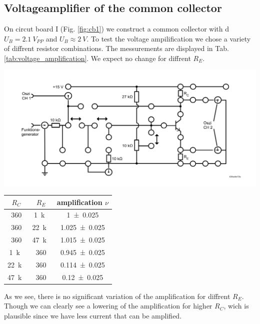 \documentclass[a4paper,10pt]{article}
\newenvironment{Figure}
  {\par\medskip\noindent\minipage{\linewidth}}
  {\endminipage\par\medskip} %
\numberwithin{equation}{section}
\begin{document}
\begin{multicols}{2}
	\subsection{Voltageamplifier of the common collector}
	On circut board I (Fig. \ref{fig:cb1}) we construct a common collector with d$U_B=\SI{2.1}{V_{PP}}$ and $U_B\approx \SI{2}{V}$. To test the voltage ampilification we chose a variety of diffrent resistor combinations. The messurements are displayed in Tab. \ref{tab:voltage_amplification}. We expect no change for diffrent $R_E$.
	\begin{Figure}
		\centering
		\includegraphics[width=1\textwidth]{circut_board_1.png}
		\label{fig:cb1}
	\end{Figure}
	\begin{center}
		\begin{tabular}{|c|c|c|}
			\hline
			$R_C$            & $R_E$            & amplification $\nu$ \\
			\hline
			\SI{360}{\Omega} & \SI{1}{k\Omega}  & \SI{1+-0.025}{}     \\
			\SI{360}{\Omega} & \SI{22}{k\Omega} & \SI{1.025+-0.025}{} \\
			\SI{360}{\Omega} & \SI{47}{k\Omega} & \SI{1.015+-0.025}{} \\
			\hline
			\SI{1}{k\Omega}  & \SI{360}{\Omega} & \SI{0.945+-0.025}{} \\
			\SI{22}{k\Omega} & \SI{360}{\Omega} & \SI{0.114+-0.025}{} \\
			\SI{47}{k\Omega} & \SI{360}{\Omega} & \SI{0.12+-0.025}{}  \\
			\hline
		\end{tabular}
		\label{tab:voltage_amplification}
	\end{center}
	As we see, there is no significant variation of the amplification for diffrent $R_E$. Though we can clearly see a lowering of the amplification for higher $R_C$, wich is plausible since we have less current that can be amplified.


\end{multicols}
\end{document}
